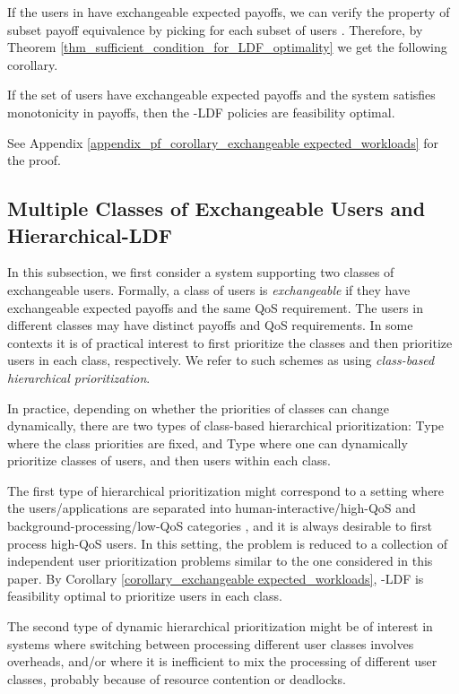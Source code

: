 \documentclass[prodmode,acmtompecs]{acmsmall}
\begin{document}
If the users in  have exchangeable expected payoffs, we can verify the property of subset payoff equivalence by picking  for each subset of users .
Therefore, by Theorem \ref{thm_sufficient_condition_for_LDF_optimality} we get the following corollary. 

\begin{corollary}
\label{corollary_exchangeable expected_workloads}
If the set of users  have exchangeable expected payoffs and the system satisfies monotonicity in payoffs, then the -LDF policies are feasibility optimal. 
\end{corollary}

\noindent See Appendix \ref{appendix_pf_corollary_exchangeable expected_workloads} for the proof. 

\subsection{Multiple Classes of Exchangeable Users and Hierarchical-LDF}
\label{subsection_multiple_classes_of_users}
In this subsection, we first consider a system supporting two classes of exchangeable users. 
Formally, a class of users is {\em exchangeable} if they have exchangeable expected payoffs and the same QoS requirement. 
The users in different classes may have distinct payoffs and QoS requirements. 
In some contexts it is of practical interest to first prioritize the classes and then prioritize users in each class, respectively. We refer to such schemes as using {\em class-based hierarchical prioritization}. 

In practice, depending on whether the priorities of classes can change dynamically, there are two types of class-based hierarchical prioritization: Type  where the class priorities are fixed, and Type  where one can dynamically prioritize classes of users, and then users within each class. 

The first type of hierarchical prioritization might correspond to a setting where the users/applications are separated into human-interactive/high-QoS and background-processing/low-QoS categories \cite{PCO}, and it is always desirable to first process high-QoS users. In this setting, the problem is reduced to a collection of independent user prioritization problems similar to the one considered in this paper. By Corollary \ref{corollary_exchangeable expected_workloads}, -LDF is feasibility optimal to prioritize users in each class. 

The second type of dynamic hierarchical prioritization might be of interest in systems where switching between processing different user classes involves overheads, and/or where it is inefficient to mix the processing of different user classes, probably because of resource contention or deadlocks. 
\end{document}
